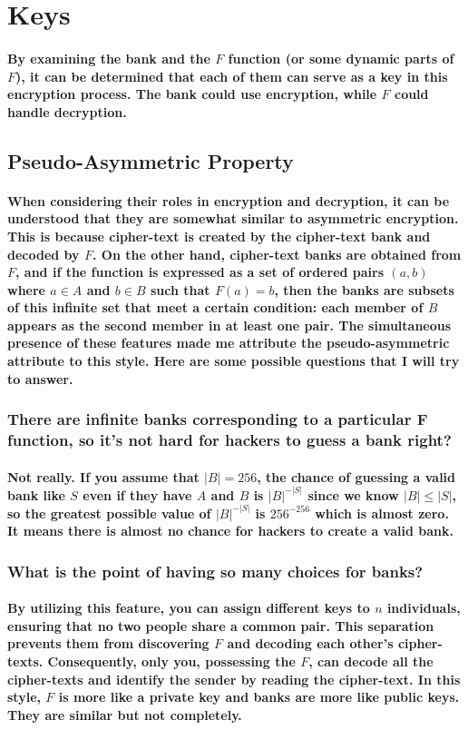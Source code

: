 \documentclass[oneside]{book}
\newcommand{\myparagraph}[1]{\paragraph{\textnormal{#1}}}
\begin{document}
\newpage

\section{Keys}

\myparagraph{
By examining the bank and the $F$ function (or some dynamic parts of $F$), it can be determined that each of them can serve as a key in this encryption process. The bank could use encryption, while $F$ could handle decryption.
}

\subsection{Pseudo-Asymmetric Property}

\myparagraph{
When considering their roles in encryption and decryption, it can be understood that they are somewhat similar to asymmetric encryption. This is because cipher-text is created by the cipher-text bank and decoded by $F$. On the other hand, cipher-text banks are obtained from $F$, and if the function is expressed as a set of ordered pairs $(a, b)$ where $a \in A$ and $b \in B$ such that $F(a) = b$, then the banks are subsets of this infinite set that meet a certain condition: each member of $B$ appears as the second member in at least one pair. The simultaneous presence of these features made me attribute the \textbf{pseudo-asymmetric} attribute to this style. Here are some possible questions that I will try to answer.
}

\subsubsection*{There are infinite banks corresponding to a particular F function, so it's not hard for hackers to guess a bank right?}

\myparagraph{
Not really. If you assume that $|B| = 256$, the chance of guessing a valid bank like $S$ even if they have $A$ and $B$ is $|B|^{-|S|}$ since we know $|B| \leq |S|$, so the greatest possible value of $|B|^{-|S|}$ is $256^{-256}$ which is almost zero. It means there is almost no chance for hackers to create a valid bank.
}

\subsubsection*{What is the point of having so many choices for banks?}

\myparagraph{
By utilizing this feature, you can assign different keys to $n$ individuals, ensuring that no two people share a common pair. This separation prevents them from discovering $F$ and decoding each other’s cipher-texts. Consequently, only you, possessing the $F$, can decode all the cipher-texts and identify the sender by reading the cipher-text. In this style, $F$ is more like a private key and banks are more like public keys. They are similar but not completely.
}
\end{document}
